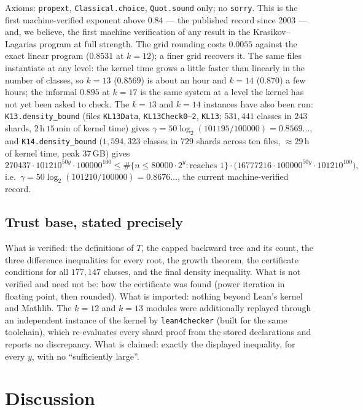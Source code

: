 \documentclass[11pt]{article}
\newcommand{\code}[1]{\texttt{#1}}
\begin{document}
Axioms: \code{propext}, \code{Classical.choice}, \code{Quot.sound}
only; no \code{sorry}. This is the first machine-verified exponent
above $0.84$ --- the published record since 2003 --- and, we believe,
the first machine verification of any result in the
Krasikov--Lagarias program at full strength. The grid rounding costs
$0.0055$ against the exact linear program ($0.8531$ at $k = 12$); a
finer grid recovers it. The same files instantiate at any level: the
kernel time grows a little faster than linearly in the number of
classes, so $k = 13$ ($0.8569$) is about an hour and $k = 14$ ($0.870$)
a few hours; the informal $0.895$ at $k = 17$ is the same system at a level
the kernel has not yet been asked to check. The $k = 13$ and $k = 14$ instances have also been run: \code{K13.density\_bound} (files \code{KL13Data},
\code{KL13Check0--2}, \code{KL13}; $531{,}441$ classes in $243$ shards,
$2$\,h\,$15$\,min of kernel time) gives $\gamma = 50\log_2(101195/100000)
= 0.8569\ldots$, and \code{K14.density\_bound} ($1{,}594{,}323$ classes
in $729$ shards across ten files, $\approx 29$\,h of kernel time, peak
$37$\,GB) gives
\[
270437 \cdot 101210^{50y} \cdot 100000^{100} \le \#\{n \le 80000\cdot 2^y
: \text{reaches } 1\}\cdot\big(16777216 \cdot 100000^{50y}\cdot
101210^{100}\big),
\]
i.e.\ $\gamma = 50\log_2(101210/100000) = 0.8676\ldots$, the current
machine-verified record.

\subsection*{Trust base, stated precisely}

What is verified: the definitions of $T$, the capped backward tree and
its count, the three difference inequalities for every root, the
growth theorem, the certificate conditions for all $177{,}147$
classes, and the final density inequality. What is not verified and
need not be: how the certificate was found (power iteration in
floating point, then rounded). What is imported: nothing beyond
Lean's kernel and Mathlib. The $k = 12$ and $k = 13$ modules were additionally replayed through an
independent instance of the kernel by \code{lean4checker} (built for
the same toolchain), which re-evaluates every shard proof from the
stored declarations and reports no discrepancy. What is claimed: exactly the displayed
inequality, for every $y$, with no ``sufficiently large''.

\section{Discussion}\label{sec:disc}
\end{document}
